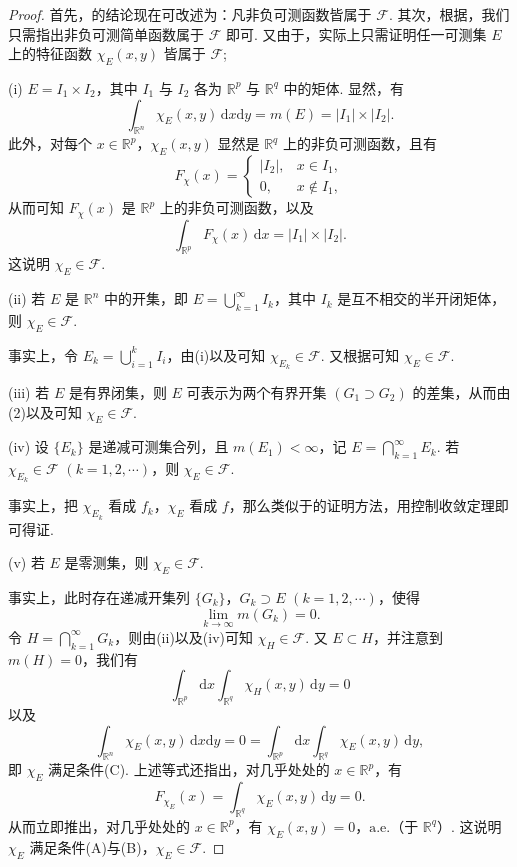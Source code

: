 \documentclass[../../main.tex]{subfiles}
\begin{document}
\begin{proof}
首先，的结论现在可改述为：凡非负可测函数皆属于 \( \mathcal{F} \). 其次，根据，我们只需指出非负可测简单函数属于 \( \mathcal{F} \) 即可. 又由于，实际上只需证明任一可测集 \( E \) 上的特征函数 \( \chi_E(x, y) \) 皆属于 \( \mathcal{F} \);

(i) \( E = I_1 \times I_2 \)，其中 \( I_1 \) 与 \( I_2 \) 各为 \( \mathbb{R}^p \) 与 \( \mathbb{R}^q \) 中的矩体. 显然，有
\[
\int_{\mathbb{R}^n} \chi_E(x, y) \, \mathrm{d}x\mathrm{d}y = m(E) = |I_1| \times |I_2|.
\]
此外，对每个 \( x \in \mathbb{R}^p \)，\( \chi_E(x, y) \) 显然是 \( \mathbb{R}^q \) 上的非负可测函数，且有
\[
F_{\chi}(x) = 
\begin{cases} 
|I_2|, & x \in I_1, \\
0, & x \notin I_1,
\end{cases}
\]
从而可知 \( F_{\chi}(x) \) 是 \( \mathbb{R}^p \) 上的非负可测函数，以及
\[
\int_{\mathbb{R}^p} F_{\chi}(x) \, \mathrm{d}x = |I_1| \times |I_2|.
\]
这说明 \( \chi_E \in \mathcal{F} \).

(ii) 若 \( E \) 是 \( \mathbb{R}^n \) 中的开集，即 \( E = \bigcup_{k = 1}^{\infty} I_k \)，其中 \( I_k \) 是互不相交的半开闭矩体，则 \( \chi_E \in \mathcal{F} \).

事实上，令 \( E_k = \bigcup_{i = 1}^k I_i \)，由(i)以及可知 \( \chi_{E_k} \in \mathcal{F} \). 又根据可知 \( \chi_E \in \mathcal{F} \).

(iii) 若 \( E \) 是有界闭集，则 \( E \) 可表示为两个有界开集 \( (G_1 \supset G_2) \) 的差集，从而由(2)以及可知 \( \chi_E \in \mathcal{F} \).

(iv) 设 \( \{ E_k \} \) 是递减可测集合列，且 \( m(E_1) < \infty \)，记 \( E = \bigcap_{k = 1}^{\infty} E_k \). 若 \( \chi_{E_k} \in \mathcal{F} \) \( (k = 1, 2, \cdots) \)，则 \( \chi_E \in \mathcal{F} \).

事实上，把 \( \chi_{E_k} \) 看成 \( f_k \)，\( \chi_E \) 看成 \( f \)，那么类似于的证明方法，用控制收敛定理即可得证.

(v) 若 \( E \) 是零测集，则 \( \chi_E \in \mathcal{F} \).

事实上，此时存在递减开集列 \( \{ G_k \} \)，\( G_k \supset E \) \( (k = 1, 2, \cdots) \)，使得
\[
\lim_{k \to \infty} m(G_k) = 0.
\]
令 \( H = \bigcap_{k = 1}^{\infty} G_k \)，则由(ii)以及(iv)可知 \( \chi_H \in \mathcal{F} \). 又 \( E \subset H \)，并注意到 \( m(H) = 0 \)，我们有
\[
\int_{\mathbb{R}^p} \mathrm{d}x \int_{\mathbb{R}^q} \chi_H(x, y) \, \mathrm{d}y = 0
\]
以及
\[
\int_{\mathbb{R}^n} \chi_E(x, y) \, \mathrm{d}x\mathrm{d}y = 0 = \int_{\mathbb{R}^p} \mathrm{d}x \int_{\mathbb{R}^q} \chi_E(x, y) \, \mathrm{d}y,
\]
即 \( \chi_E \) 满足条件(C). 上述等式还指出，对几乎处处的 \( x \in \mathbb{R}^p \)，有
\[
F_{\chi_E}(x) = \int_{\mathbb{R}^q} \chi_E(x, y) \, \mathrm{d}y = 0.
\]
从而立即推出，对几乎处处的 \( x \in \mathbb{R}^p \)，有 \( \chi_E(x, y) = 0 \)，\(\text{a.e.}\)（于 \( \mathbb{R}^q \)）. 这说明 \( \chi_E \) 满足条件(A)与(B)，\( \chi_E \in \mathcal{F} \).


\end{proof}
\end{document}
